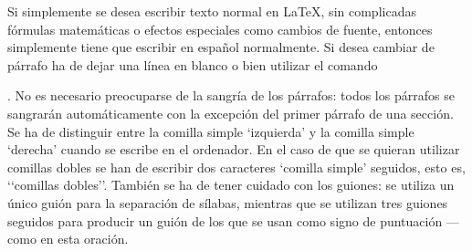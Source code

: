 \documentclass[a4paper,10pt]{letter}
\begin{document}
 Si simplemente se desea escribir texto normal en LaTeX,
 sin complicadas fórmulas matemáticas o efectos especiales
 como cambios de fuente, entonces simplemente tiene que escribir
 en español normalmente.
 Si desea cambiar de párrafo ha de dejar una línea en blanco o bien
 utilizar el comando \par.
 No es necesario preocuparse de la sangría de los párrafos:
 todos los párrafos se sangrarán automáticamente con la excepción
 del primer párrafo de una sección.
 Se ha de distinguir entre la comilla simple ‘izquierda’
 y la comilla simple ‘derecha’ cuando se escribe en el ordenador.
 En el caso de que se quieran utilizar comillas dobles se han de
 escribir dos caracteres ‘comilla simple’ seguidos, esto es,
 ‘‘comillas dobles’’.
 También se ha de tener cuidado con los guiones: se utiliza un único
 guión para la separación de sílabas, mientras que se utilizan
 tres guiones seguidos para producir un guión de los que se usan
 como signo de puntuación --- como en esta oración.
 
\end{document}
